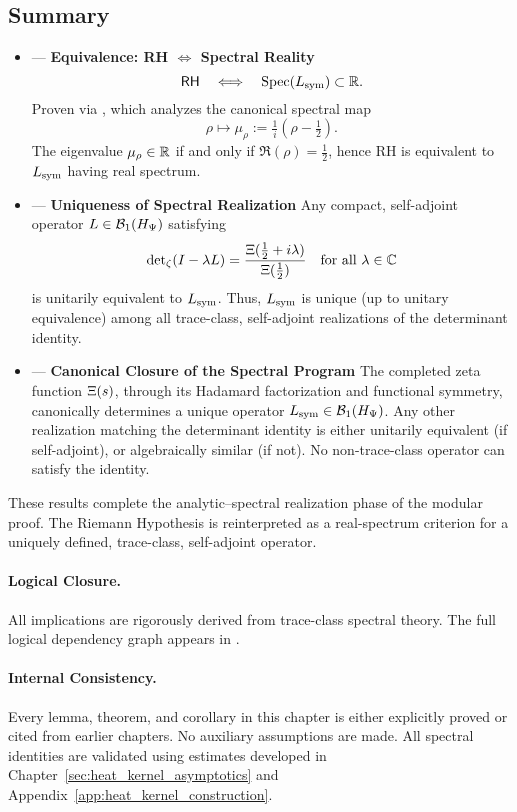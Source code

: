 \subsection*{Summary}

\begin{itemize}
  \item {} — \textbf{Equivalence: RH \( \iff \) Spectral Reality}
  \[
  \mathsf{RH} \quad \Longleftrightarrow \quad \operatorname{Spec}(L_{\mathrm{sym}}) \subset \mathbb{R}.
  \]
  Proven via , which analyzes the canonical spectral map
  \[
  \rho \mapsto \mu_\rho := \tfrac{1}{i}(\rho - \tfrac{1}{2}).
  \]
  The eigenvalue \( \mu_\rho \in \mathbb{R} \) if and only if \( \Re(\rho) = \tfrac{1}{2} \), hence RH is equivalent to \( L_{\mathrm{sym}} \) having real spectrum.

  \item {} — \textbf{Uniqueness of Spectral Realization}  
  Any compact, self-adjoint operator \( L \in \mathcal{B}_1(H_{\Psi}) \) satisfying
  \[
  \det\nolimits_{\zeta}(I - \lambda L) = \frac{\Xi(\tfrac{1}{2} + i\lambda)}{\Xi(\tfrac{1}{2})}
  \quad \text{for all } \lambda \in \mathbb{C}
  \]
  is unitarily equivalent to \( L_{\mathrm{sym}} \). Thus, \( L_{\mathrm{sym}} \) is unique (up to unitary equivalence) among all trace-class, self-adjoint realizations of the determinant identity.

  \item {} — \textbf{Canonical Closure of the Spectral Program}  
  The completed zeta function \( \Xi(s) \), through its Hadamard factorization and functional symmetry, canonically determines a unique operator \( L_{\mathrm{sym}} \in \mathcal{B}_1(H_{\Psi}) \). Any other realization matching the determinant identity is either unitarily equivalent (if self-adjoint), or algebraically similar (if not). No non-trace-class operator can satisfy the identity.
\end{itemize}

\medskip

These results complete the analytic–spectral realization phase of the modular proof. The Riemann Hypothesis is reinterpreted as a real-spectrum criterion for a uniquely defined, trace-class, self-adjoint operator.

\paragraph{Logical Closure.}
All implications are rigorously derived from trace-class spectral theory. The full logical dependency graph appears in .

\paragraph{Internal Consistency.}
Every lemma, theorem, and corollary in this chapter is either explicitly proved or cited from earlier chapters. No auxiliary assumptions are made. All spectral identities are validated using estimates developed in Chapter~\ref{sec:heat_kernel_asymptotics} and Appendix~\ref{app:heat_kernel_construction}.
